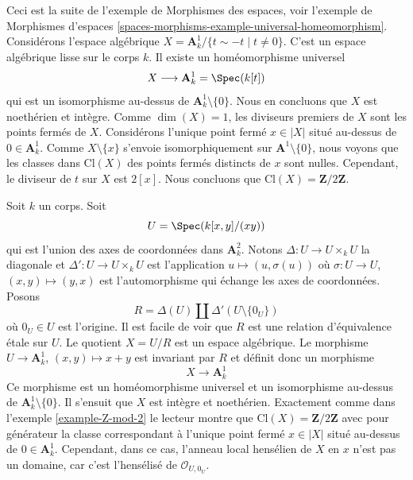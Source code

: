 \begin{example}
\label{example-Z-mod-2}
Ceci est la suite de l'exemple de Morphismes des espaces,
voir l'exemple de Morphismes d'espaces \ref{spaces-morphisms-example-universal-homeomorphism}.
Considérons l'espace algébrique
$X = \mathbf{A}^1_k/\{t \sim -t \mid t \not = 0\}$.
C'est un espace algébrique lisse sur le corps $k$.
Il existe un homéomorphisme universel
$$
X \longrightarrow \mathbf{A}^1_k = \Spec(k[t])
$$
qui est un isomorphisme au-dessus de $\mathbf{A}^1_k \setminus \{0\}$.
Nous en concluons que $X$ est noethérien et intègre.
Comme $\dim(X) = 1$, les diviseurs premiers de $X$ sont
les points fermés de $X$.
Considérons l'unique point fermé $x \in |X|$ situé au-dessus de $0 \in \mathbf{A}^1_k$.
Comme $X \setminus \{x\}$ s'envoie isomorphiquement sur $\mathbf{A}^1 \setminus \{0\}$,
nous voyons que les classes dans $\text{Cl}(X)$ des points fermés distincts
de $x$ sont nulles. Cependant, le diviseur de $t$ sur $X$ est $2[x]$.
Nous concluons que $\text{Cl}(X) = \mathbf{Z}/2\mathbf{Z}$.
\end{example}

\begin{example}
\label{example-not-a-domain}
Soit $k$ un corps. Soit
$$
U = \Spec(k[x, y]/(xy))
$$
qui est l'union des axes de coordonnées dans $\mathbf{A}^2_k$.
Notons $\Delta : U \to U \times_k U$ la diagonale et
$\Delta' : U \to U \times_k U$ est l'application $u \mapsto (u, \sigma(u))$
où $\sigma : U \to U$, $(x, y) \mapsto (y, x)$
est l'automorphisme qui échange les axes de coordonnées. Posons
$$
R = \Delta(U) \amalg \Delta'(U \setminus \{0_U\})
$$
où $0_U \in U$ est l'origine. Il est facile de voir que
$R$ est une relation d'équivalence \'etale sur $U$. Le quotient $X = U/R$
est un espace algébrique. Le morphisme $U \to \mathbf{A}^1_k$,
$(x, y) \mapsto x + y$ est invariant par $R$ et définit donc
un morphisme
$$
X \longrightarrow \mathbf{A}^1_k
$$
Ce morphisme est un homéomorphisme universel et un isomorphisme au-dessus de
$\mathbf{A}^1_k \setminus \{0\}$. Il s'ensuit que $X$ est intègre
et noethérien. Exactement comme dans l'exemple \ref{example-Z-mod-2}
le lecteur montre que $\text{Cl}(X) = \mathbf{Z}/2\mathbf{Z}$
avec pour générateur la classe correspondant à l'unique point fermé $x \in |X|$
situé au-dessus de $0 \in \mathbf{A}^1_k$. Cependant, dans ce cas, l'anneau local hensélien
de $X$ en $x$ n'est pas un domaine, car c'est l'hensélisé
de $\mathcal{O}_{U, 0_U}$.
\end{example}














